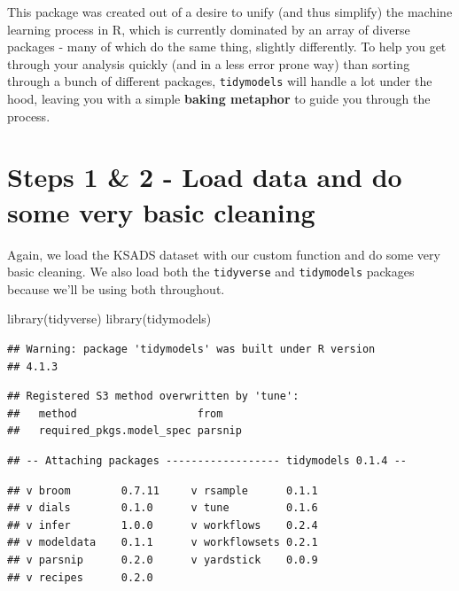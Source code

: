 \documentclass[
]{book}
\newenvironment{Shaded}{\begin{snugshade}}{\end{snugshade}}
\newcommand{\FunctionTok}[1]{\textcolor[rgb]{0.00,0.00,0.00}{#1}}
\newcommand{\NormalTok}[1]{#1}
\begin{document}
This package was created out of a desire to unify (and thus simplify) the machine learning process in R, which is currently dominated by an array of diverse packages - many of which do the same thing, slightly differently. To help you get through your analysis quickly (and in a less error prone way) than sorting through a bunch of different packages, \texttt{tidymodels} will handle a lot under the hood, leaving you with a simple \textbf{baking metaphor} to guide you through the process.

\hypertarget{steps-1-2---load-data-and-do-some-very-basic-cleaning}{%
\section{Steps 1 \& 2 - Load data and do some very basic cleaning}\label{steps-1-2---load-data-and-do-some-very-basic-cleaning}}

Again, we load the KSADS dataset with our custom function and do some very basic cleaning. We also load both the \texttt{tidyverse} and \texttt{tidymodels} packages because we'll be using both throughout.

\begin{Shaded}
\begin{Highlighting}[]
\FunctionTok{library}\NormalTok{(tidyverse)}
\FunctionTok{library}\NormalTok{(tidymodels)}
\end{Highlighting}
\end{Shaded}

\begin{verbatim}
## Warning: package 'tidymodels' was built under R version
## 4.1.3
\end{verbatim}

\begin{verbatim}
## Registered S3 method overwritten by 'tune':
##   method                   from   
##   required_pkgs.model_spec parsnip
\end{verbatim}

\begin{verbatim}
## -- Attaching packages ------------------ tidymodels 0.1.4 --
\end{verbatim}

\begin{verbatim}
## v broom        0.7.11     v rsample      0.1.1 
## v dials        0.1.0      v tune         0.1.6 
## v infer        1.0.0      v workflows    0.2.4 
## v modeldata    0.1.1      v workflowsets 0.2.1 
## v parsnip      0.2.0      v yardstick    0.0.9 
## v recipes      0.2.0
\end{verbatim}
\end{document}
